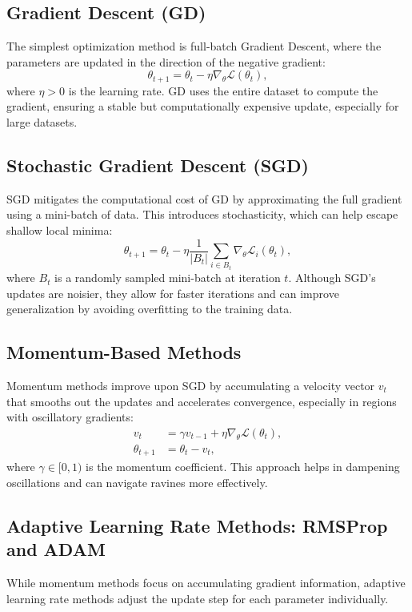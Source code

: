 \subsection{Gradient Descent (GD)}
The simplest optimization method is full-batch Gradient Descent, where the parameters are updated in the direction of the negative gradient:
\begin{equation}
\theta_{t+1} = \theta_t - \eta \nabla_\theta \mathcal{L}(\theta_t),
\label{eq:gd_update}
\end{equation}
where \(\eta > 0\) is the learning rate. GD uses the entire dataset to compute the gradient, ensuring a stable but computationally expensive update, especially for large datasets.

\subsection{Stochastic Gradient Descent (SGD)}
SGD mitigates the computational cost of GD by approximating the full gradient using a mini-batch of data. This introduces stochasticity, which can help escape shallow local minima:
\begin{equation}
\theta_{t+1} = \theta_t - \eta \frac{1}{|B_t|} \sum_{i \in B_t} \nabla_\theta \mathcal{L}_i(\theta_t),
\label{eq:sgd_update}
\end{equation}
where \(B_t\) is a randomly sampled mini-batch at iteration \(t\). Although SGD’s updates are noisier, they allow for faster iterations and can improve generalization by avoiding overfitting to the training data.

\subsection{Momentum-Based Methods}
Momentum methods improve upon SGD by accumulating a velocity vector \(v_t\) that smooths out the updates and accelerates convergence, especially in regions with oscillatory gradients:
\begin{align}
v_t &= \gamma v_{t-1} + \eta \nabla_\theta \mathcal{L}(\theta_t), \\
\theta_{t+1} &= \theta_t - v_t,
\label{eq:momentum_update}
\end{align}
where \(\gamma \in [0,1)\) is the momentum coefficient. This approach helps in dampening oscillations and can navigate ravines more effectively.

\subsection{Adaptive Learning Rate Methods: RMSProp and ADAM}
While momentum methods focus on accumulating gradient information, adaptive learning rate methods adjust the update step for each parameter individually.

